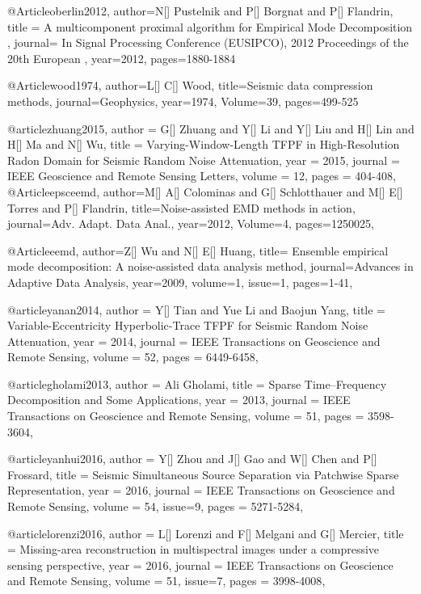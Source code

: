 @Article{oberlin2012,
  author={N[] Pustelnik and P[] Borgnat and P[] Flandrin},
  title = { A multicomponent proximal algorithm for Empirical Mode Decomposition },
  journal={  In Signal Processing Conference (EUSIPCO), 2012 Proceedings of the 20th European },
  year=2012,
  pages=1880-1884}
  
@Article{wood1974,
  author={L[] C[] Wood},
  title={Seismic data compression methods},
  journal={Geophysics},
  year=1974,
  Volume=39,
  pages={499-525}
}

@article{zhuang2015,
  author =	 {G[] Zhuang and Y[] Li and Y[] Liu and H[] Lin and H[] Ma and N[] Wu},
  title =	 {Varying-Window-Length {TFPF} in High-Resolution Radon Domain for Seismic Random Noise Attenuation},
  year =	 2015,
  journal =	 {IEEE Geoscience and Remote Sensing Letters},
  volume =	 12,
  pages =	 {404-408},
}
@Article{epsceemd,
  author={M[] A[] Colominas and G[] Schlotthauer and M[] E[] Torres and P[] Flandrin},
  title={Noise-assisted {EMD} methods in action},
  journal={Adv. Adapt. Data Anal.},
  year=2012,
  Volume=4,
  pages={1250025},
}

@Article{eemd,
  author={Z[] Wu and N[] E[] Huang},
  title={ Ensemble empirical mode decomposition: A noise-assisted data analysis method},
  journal={Advances in Adaptive Data Analysis},
  year=2009,
  volume=1,
  issue=1,
  pages={1-41},
}

@article{yanan2014,
  author =	 {Y[] Tian and Yue Li and Baojun Yang},
  title =	 {Variable-Eccentricity Hyperbolic-Trace {TFPF} for Seismic Random Noise Attenuation},
  year =	 2014,
  journal =	 {IEEE Transactions on Geoscience and Remote Sensing},
  volume =	 52,
  pages =	 {6449-6458},
}

@article{gholami2013,
  author =	 {Ali Gholami},
  title =	 {Sparse Time–Frequency Decomposition and Some Applications},
  year =	 2013,
  journal =	 {IEEE Transactions on Geoscience and Remote Sensing},
  volume =	 51,
  pages =	 {3598-3604},
}


@article{yanhui2016,
  author =	 {Y[] Zhou and J[] Gao and W[] Chen and P[] Frossard},
  title =	 {Seismic Simultaneous Source Separation via Patchwise Sparse Representation},
  year =	 2016,
  journal =	 {IEEE Transactions on Geoscience and Remote Sensing},
  volume =	 54,
  issue=9,
  pages =	 {5271-5284},
}

@article{lorenzi2016,
  author =	 {L[] Lorenzi and F[] Melgani and G[] Mercier},
  title =	 {Missing-area reconstruction in multispectral images under a compressive sensing perspective},
  year =	 2016,
  journal =	 {IEEE Transactions on Geoscience and Remote Sensing},
  volume =	 51,
  issue=7,
  pages =	 {3998-4008},
}

